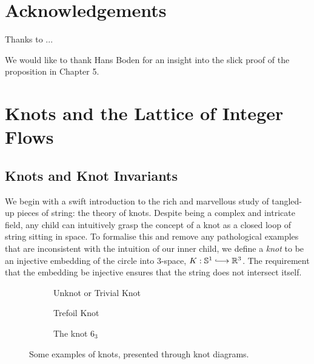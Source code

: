 \documentclass[12pt]{report}
\newcommand{\R}{\mathbb{R}}
\renewcommand{\S}{\mathbb{S}}
\begin{document}
\chapter*{Acknowledgements}

Thanks to ...

We would like to thank Hans Boden for an insight into the slick proof of the proposition in Chapter 5.


\chapter{Knots and the Lattice of Integer Flows}

\section{Knots and Knot Invariants}

We begin with a swift introduction to the rich and marvellous study of tangled-up pieces of string: the theory of knots. Despite being a complex and intricate field, any child can intuitively grasp the concept of a knot as a closed loop of string sitting in space. To formalise this and remove any pathological examples that are inconsistent with the intuition of our inner child, we define a \textit{knot} to be an injective embedding of the circle into $3$-space, $K: \S^{1} \lhook\joinrel\longrightarrow \R^{3}$. The requirement that the embedding be injective ensures that the string does not intersect itself.

\begin{figure}[hbt!]
	\centering
	\hspace*{\fill}
	\begin{subfigure}[b]{0.3 \textwidth}
		\centering
		\def\svgscale{0.2}
		
		\caption{Unknot or Trivial Knot}
		\label{fig:unknot}
	\end{subfigure}
	\hspace*{\fill}
	\begin{subfigure}[b]{0.3 \textwidth}
		\centering
		\def\svgscale{0.2}
		
		\caption{Trefoil Knot}
	\end{subfigure}
	\hspace*{\fill}
	\begin{subfigure}[b]{0.3 \textwidth}
		\centering
		\def\svgscale{0.2}
		
		\caption{The knot $6_{3}$}
	\end{subfigure}
	\caption{Some examples of knots, presented through knot diagrams.}
	\label{fig:knot-examples}
	\hspace*{\fill} 
\end{figure}
\end{document}

